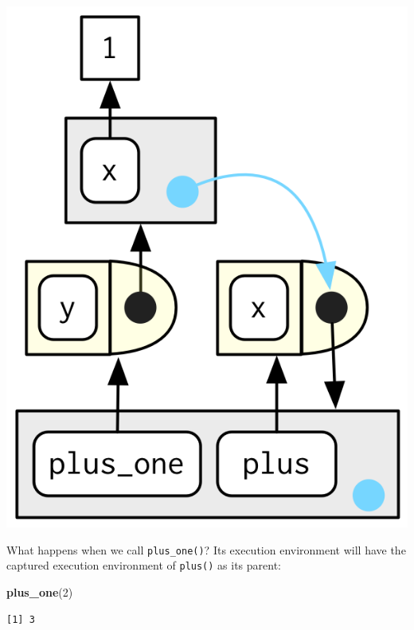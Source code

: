 \documentclass[]{book}
\newenvironment{Shaded}{\begin{snugshade}}{\end{snugshade}}
\newcommand{\DecValTok}[1]{\textcolor[rgb]{0.00,0.00,0.81}{#1}}
\newcommand{\KeywordTok}[1]{\textcolor[rgb]{0.13,0.29,0.53}{\textbf{#1}}}
\newcommand{\NormalTok}[1]{#1}
\theoremstyle{definition}
\theoremstyle{definition}
\theoremstyle{definition}
\theoremstyle{remark}
\begin{document}
\begin{center}\includegraphics{diagrams/environments/closure} \end{center}

What happens when we call \texttt{plus\_one()}? Its execution
environment will have the captured execution environment of
\texttt{plus()} as its parent:

\begin{Shaded}
\begin{Highlighting}[]
\KeywordTok{plus_one}\NormalTok{(}\DecValTok{2}\NormalTok{)}
\end{Highlighting}
\end{Shaded}

\begin{verbatim}
[1] 3
\end{verbatim}
\end{document}
